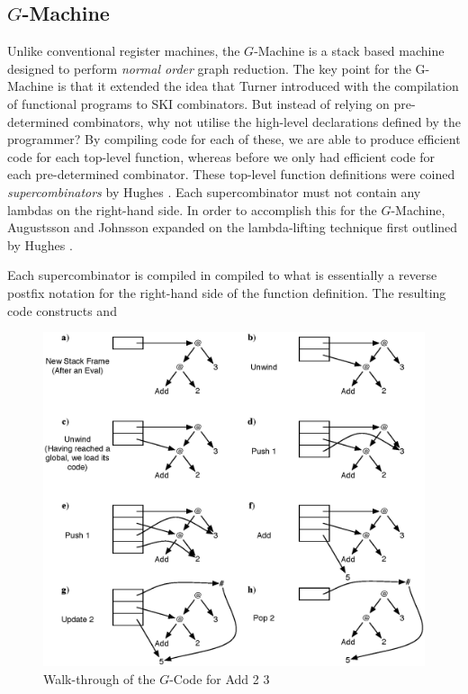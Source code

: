  \subsection{$G$-Machine}
    Unlike conventional register machines, the $G$-Machine is a stack based
machine designed to perform \emph{normal order} graph reduction.
    The key point for the G-Machine \citep{Augustsson:LazyMLCompiler}
is that it extended the idea that Turner introduced
with the compilation of functional programs to SKI combinators.
But instead of relying on pre-determined combinators, why not
utilise the high-level declarations defined by the programmer? By compiling
code for each of these, we are able to produce
efficient code for each top-level function, whereas before we only had efficient
code for each pre-determined combinator. These top-level function definitions
were coined \emph{supercombinators} by Hughes \citep{hughes:thesis}. Each
supercombinator must not contain any lambdas on the right-hand side. In order to
accomplish this for the $G$-Machine, Augustsson and
Johnsson expanded on the lambda-lifting technique first outlined by Hughes
\citep{Augustsson:LazyMLCompiler, hughes:thesis}.

    Each supercombinator is compiled in compiled to what is essentially a
reverse postfix notation for the right-hand side of the function definition.
The resulting code constructs and
\begin{figure}[h!]
  \centering
  \includegraphics[scale=0.55]{Background/figures/AddExample.eps}
  \caption[G-Code execution example]
   {Walk-through of the \(G\)-Code for Add 2 3}
  \label{example:gCode}
\end{figure}


